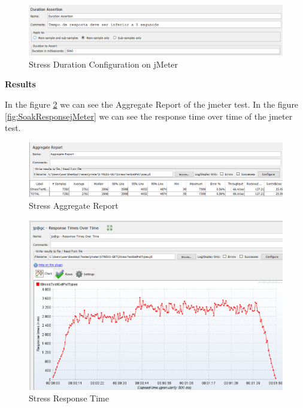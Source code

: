 \documentclass[a4paper,11pt,openright,BCOR=15mm]{scrbook}
\begin{document}
\begin{figure}[H]
	\centering
	\includegraphics[width=\textwidth]{figs/Performance/jmeter/StressJmeterDurationAssertion.png}
	\caption{Stress Duration Configuration on jMeter}
	\label{fig:StressDurationjMeter}
\end{figure}




\textbf{Results}

In the figure \ref{fig:StressAggregatejMeter} we can see the Aggregate Report of the jmeter test. In the figure \ref{fig:SoakResponsejMeter} we can see the response time over time of the jmeter test.

\begin{figure}[H]
	\centering
	\includegraphics[width=\textwidth]{figs/Performance/jmeter/StressGetAgregateResult.png}
	\caption{Stress Aggregate Report}
	\label{fig:StressAggregatejMeter}
\end{figure}

\begin{figure}[H]
	\centering
	\includegraphics[width=\textwidth]{figs/Performance/jmeter/StressGetResponsesOverTime.png}
	\caption{Stress Response Time}
	\label{fig:StressResponsejMeter}
\end{figure}
 
\end{document}
